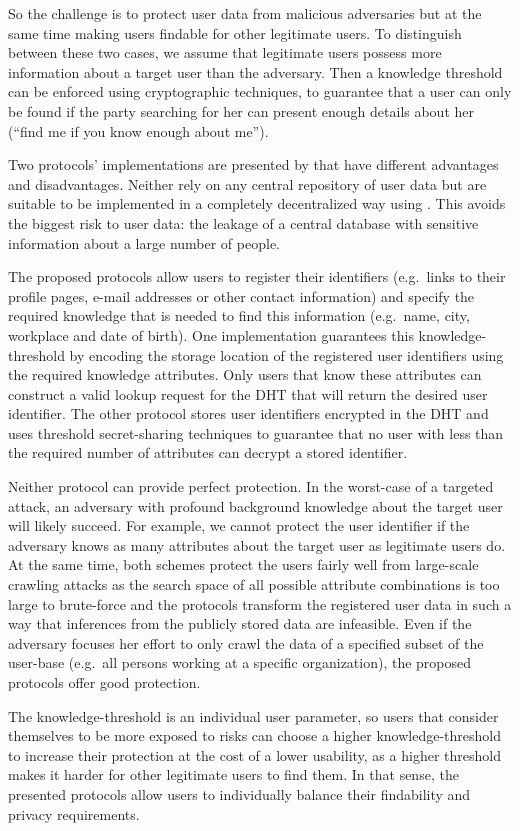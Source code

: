 So the challenge is to protect user data from malicious adversaries but
at the same time making users findable for other legitimate users.
To distinguish between these two cases, we assume that legitimate users
possess more information about a target user than the adversary.
Then a knowledge threshold can be enforced using cryptographic techniques, to
guarantee that a user can only be found if the party searching for her
can present enough details about her (\enquote{find me if you know enough about
me}).

Two protocols' implementations are presented by \citet{ThresholdUserSearch} 
that have different advantages and disadvantages.
Neither rely on any central repository of user data but are suitable to be 
implemented in a completely decentralized way using .
This avoids the biggest risk to user data: the leakage of a central database 
with sensitive information about a large number of people.

The proposed protocols allow users to register their identifiers (e.g.\ 
links to their profile pages, e-mail addresses or other contact
information) and specify the required knowledge that is needed to find
this information (e.g.\  name, city, workplace and date of birth).
One implementation guarantees this knowledge-threshold by encoding the
storage location of the registered user identifiers using the required
knowledge attributes.
Only users that know these attributes can construct a valid lookup request for 
the \ac{DHT} that will return the desired user identifier.
The other protocol stores user identifiers encrypted in the \ac{DHT} and uses 
threshold secret-sharing techniques to guarantee that no user with less than 
the required number of attributes can decrypt a stored identifier.

Neither protocol can provide perfect protection.
In the worst-case of a targeted attack, an adversary with profound background 
knowledge about the target user will likely succeed.
For example, we cannot protect the user identifier if the adversary knows as 
many attributes about the target user as legitimate users do.
At the same time, both schemes protect the users fairly well from large-scale 
crawling attacks as the search space of all possible attribute combinations is 
too large to brute-force and the protocols transform the registered user data 
in such a way that inferences from the publicly stored data are infeasible.
Even if the adversary focuses her effort to only crawl the data of a specified 
subset of the user-base (e.g.\ all persons working at a specific organization), 
the proposed protocols offer good protection. 

The knowledge-threshold is an individual user parameter, so users that
consider themselves to be more exposed to risks can choose a higher
knowledge-threshold to increase their protection at the cost of a lower
usability, as a higher threshold makes it harder for other legitimate
users to find them.
In that sense, the presented protocols allow users to individually balance 
their findability and privacy requirements.

